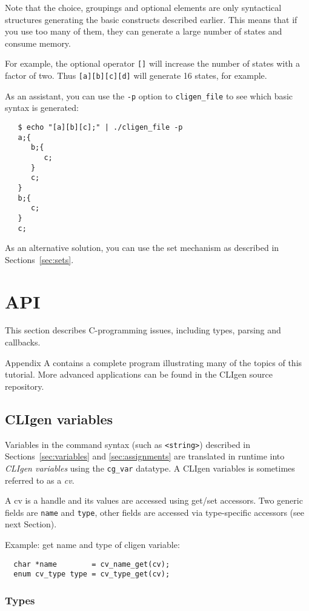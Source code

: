 \documentclass[a4paper, 10pt] {article}
\begin{document}
Note that the choice, groupings and optional elements are only
syntactical structures generating the basic constructs described
earlier. This means that if you use too many of them, they can
generate a large number of states and consume memory.

For example, the optional operator {\tt []} will increase the number of states with a
factor of two. Thus {\tt [a][b][c][d]} will generate 16 states, for
example.

As an assistant, you can use the {\tt -p} option to {\tt cligen\_file} to see which basic syntax is generated:
\begin{verbatim}
   $ echo "[a][b][c];" | ./cligen_file -p
   a;{
      b;{
         c;
      }
      c;
   }
   b;{
      c;
   }
   c;
\end{verbatim}

As an alternative solution, you can use the set mechanism as described in Sections~\ref{sec:sets}.

\section{API}
\label{sec:api}
This section describes C-programming issues, including types, parsing and
callbacks.

Appendix A contains a complete program illustrating many of the topics
of this tutorial.  More advanced applications can be found in the CLIgen
source repository.

\subsection{CLIgen variables}

Variables in the command syntax (such as {\tt <string>}) described in
Sections~\ref{sec:variables} and \ref{sec:assignments} are translated
in runtime into \emph{CLIgen variables} using the {\tt cg\_var}
datatype.  A CLIgen variables is sometimes referred to as a \emph{cv}.

A cv is a handle and its values are accessed using get/set
accessors. Two generic fields are {\tt name} and {\tt type}, other
fields are accessed via type-specific accessors (see next Section).

Example: get name and type of cligen variable:
\begin{verbatim}
  char *name        = cv_name_get(cv);
  enum cv_type type = cv_type_get(cv);
\end{verbatim}


\subsubsection{Types}
\end{document}
